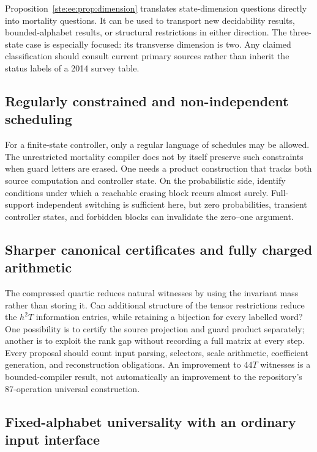 \documentclass[11pt,letterpaper]{article}
\theoremstyle{definition}
\theoremstyle{remark}
\begin{document}
Proposition~\ref{ste:ee:prop:dimension} translates state-dimension questions directly
into mortality questions. It can be used to transport new decidability results,
bounded-alphabet results, or structural restrictions in either direction. The
three-state case is especially focused: its transverse dimension is two. Any
claimed classification should consult current primary sources rather than
inherit the status labels of a 2014 survey table.

\subsection{Regularly constrained and non-independent scheduling}\label{ste:ee:q:schedules}

For a finite-state controller, only a regular language of schedules may be
allowed. The unrestricted mortality compiler does not by itself preserve such
constraints when guard letters are erased. One needs a product construction
that tracks both source computation and controller state. On the probabilistic
side, identify conditions under which a reachable erasing block recurs almost
surely. Full-support independent switching is sufficient here, but zero
probabilities, transient controller states, and forbidden blocks can invalidate
the zero--one argument.

\subsection{Sharper canonical certificates and fully charged arithmetic}\label{ste:ee:q:certificates}

The compressed quartic reduces natural witnesses by using the invariant mass
rather than storing it. Can additional structure of the tensor restrictions
reduce the $h^2T$ information entries, while retaining a bijection for every
labelled word? One possibility is to certify the source projection and guard
product separately; another is to exploit the rank gap without recording a full
matrix at every step. Every proposal should count input parsing, selectors,
scale arithmetic, coefficient generation, and reconstruction obligations. An
improvement to $44T$ witnesses is a bounded-compiler result, not automatically
an improvement to the repository's 87-operation universal construction.

\subsection{Fixed-alphabet universality with an ordinary input interface}\label{ste:ee:q:fixedalphabet}
\end{document}
